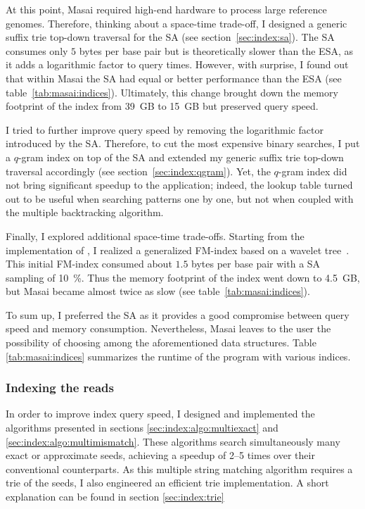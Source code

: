 At this point, Masai required high-end hardware to process large reference genomes.
Therefore, thinking about a space-time trade-off, I designed a generic suffix trie top-down traversal for the SA (see section~\ref{sec:index:sa}).
The SA consumes only $5$ bytes per base pair but is theoretically slower than the ESA, as it adds a logarithmic factor to query times.
However, with surprise, I found out that within Masai the SA had equal or better performance than the ESA (see table~\ref{tab:masai:indices}).
Ultimately, this change brought down the memory footprint of the index from 39~GB to 15~GB but preserved query speed.

I tried to further improve query speed by removing the logarithmic factor introduced by the SA.
Therefore, to cut the most expensive binary searches, I put a $q$-gram index on top of the SA and extended my generic suffix trie top-down traversal accordingly (see section~\ref{sec:index:qgram}).
Yet, the $q$-gram index did not bring significant speedup to the application;
indeed, the lookup table turned out to be useful when searching patterns one by one, but not when coupled with the multiple backtracking algorithm.

Finally, I explored additional space-time trade-offs.
Starting from the implementation of \citep{Singer2012}, I realized a generalized FM-index based on a wavelet tree~\citep{Grossi2003}.
This initial FM-index consumed about $1.5$ bytes per base pair with a SA sampling of 10~\%.
Thus the memory footprint of the index went down to 4.5~GB, but Masai became almost twice as slow (see table~\ref{tab:masai:indices}).

To sum up, I preferred the SA as it provides a good compromise between query speed and memory consumption.
Nevertheless, Masai leaves to the user the possibility of choosing among the aforementioned data structures.
Table \ref{tab:masai:indices} summarizes the runtime of the program with various indices.

\subsubsection{Indexing the reads}

In order to improve index query speed, I designed and implemented the algorithms presented in sections \ref{sec:index:algo:multiexact} and \ref{sec:index:algo:multimismatch}.
These algorithms search simultaneously many exact or approximate seeds, achieving a speedup of 2--5 times over their conventional counterparts.
As this multiple string matching algorithm requires a trie of the seeds, I also engineered an efficient trie implementation.
A short explanation can be found in section \ref{sec:index:trie}

